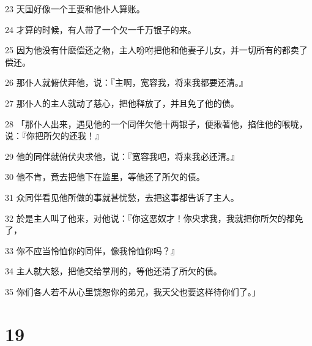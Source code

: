 \par 23 天国好像一个王要和他仆人算账。
\par 24 才算的时候，有人带了一个欠一千万银子的来。
\par 25 因为他没有什麽偿还之物，主人吩咐把他和他妻子儿女，并一切所有的都卖了偿还。
\par 26 那仆人就俯伏拜他，说：『主啊，宽容我，将来我都要还清。』
\par 27 那仆人的主人就动了慈心，把他释放了，并且免了他的债。
\par 28 「那仆人出来，遇见他的一个同伴欠他十两银子，便揪著他，掐住他的喉咙，说：『你把所欠的还我！』
\par 29 他的同伴就俯伏央求他，说：『宽容我吧，将来我必还清。』
\par 30 他不肯，竟去把他下在监里，等他还了所欠的债。
\par 31 众同伴看见他所做的事就甚忧愁，去把这事都告诉了主人。
\par 32 於是主人叫了他来，对他说：『你这恶奴才！你央求我，我就把你所欠的都免了，
\par 33 你不应当怜恤你的同伴，像我怜恤你吗？』
\par 34 主人就大怒，把他交给掌刑的，等他还清了所欠的债。
\par 35 你们各人若不从心里饶恕你的弟兄，我天父也要这样待你们了。」

\chapter{19}

